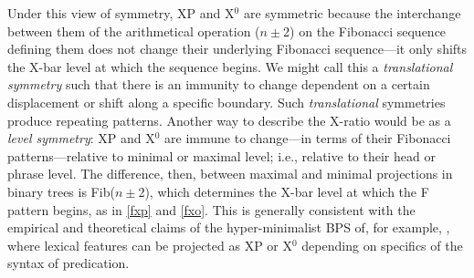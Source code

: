 \documentclass[11pt,twoside]{article}
\begin{document}
	
Under this view of symmetry, XP and X$^{0}$ are symmetric because the interchange between them of the arithmetical operation ($n\pm$2) on the Fibonacci sequence defining them does not change their underlying Fibonacci sequence---it only shifts the X-bar level at which the sequence begins. We might call this a \textsl{translational symmetry} such that there is an immunity to change dependent on a certain displacement or shift along a specific boundary. Such \textsl{translational} symmetries produce repeating patterns. Another way to describe the X-ratio would be as a \textsl{level symmetry}: XP and X$^{0}$ are immune to change---in terms of their Fibonacci patterns---relative to minimal or maximal level; i.e., relative to their head or phrase level. The difference, then, between maximal and minimal projections in binary trees is Fib($n\pm$2), which determines the X-bar level at which the F pattern begins, as in \ref{fxp} and \ref{fxo}. This is generally consistent with the empirical and theoretical claims of the hyper-minimalist BPS of, for example, \cite{carnie:2000}, where lexical features can be projected as XP or X$^{0}$ depending on specifics of the syntax of predication. 
\end{document}

